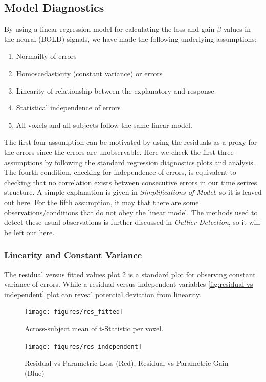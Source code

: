 \subsection{Model Diagnostics}
By using a linear regression model for calculating the loss and gain $\beta $ 
values in the neural (BOLD) signals, we have made the following underlying 
assumptions:
\begin{enumerate}
    \item Normailty of errors
    \item Homoscedasticity (constant variance) or errors  
    \item Linearity of relationship between the explanatory and response
    \item Statistical independence of errors   
    \item All voxels and all subjects follow the same linear model. 
\end{enumerate}
The first four assumption can be motivated by using the residuals as a proxy
for the errors since the errors are unobservable. Here we check the first 
three assumptions by following the standard regression diagnostics plots and 
analysis. The fourth condition, checking for independence of errors, is 
equivalent to checking that no correlation exists between consecutive errors 
in our time serires structure. A simple explanation is given in 
\textit{Simplifications of Model}, so it is leaved out here. For the fifth 
assumption, it may that there are some observations/conditions that do not 
obey the linear model. The methods used to detect these usual observations is 
further discussed in \textit{Outlier Detection}, so it will be left out here. 

\subsubsection{Linearity and Constant Variance}
The residual versus fitted values plot \ref{fig:residual vs fitted} is a 
standard plot for observing constant variance of errors. While a residual versus
independent variables \ref{fig:residual vs independent} plot can reveal 
potential deviation from linearity. 

\begin{figure}[ht]
\centering
\texttt{[image: figures/res\_fitted]}  
\caption{Across-subject mean of t-Statistic per voxel.}
\label{fig:residual vs fitted}
\end{figure}

\begin{figure}[ht]
\centering
\texttt{[image: figures/res\_independent]}  
\caption{Residual vs Parametric Loss (Red), Residual vs Parametric Gain (Blue)}
\label{fig:residual vs fitted}
\end{figure}

